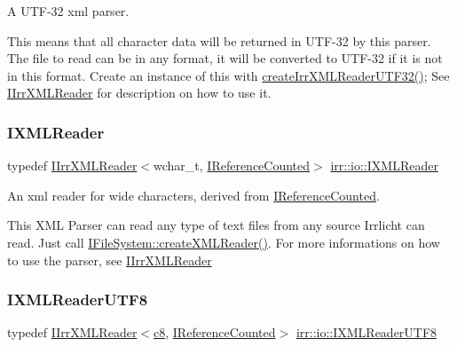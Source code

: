 A U\+T\+F-\/32 xml parser. 

This means that all character data will be returned in U\+T\+F-\/32 by this parser. The file to read can be in any format, it will be converted to U\+T\+F-\/32 if it is not in this format. Create an instance of this with \hyperlink{namespaceirr_1_1io_ae05bf7ee342431ea8c98fb98e75b974a}{create\+Irr\+X\+M\+L\+Reader\+U\+T\+F32()}; See \hyperlink{classirr_1_1io_1_1IIrrXMLReader}{I\+Irr\+X\+M\+L\+Reader} for description on how to use it. \mbox{\label{namespaceirr_1_1io_a9dc6291fb7e4c73155a3e3c8339f9bff}} 
\subsubsection{\texorpdfstring{I\+X\+M\+L\+Reader}{IXMLReader}}
{\footnotesize\ttfamily typedef \hyperlink{classirr_1_1io_1_1IIrrXMLReader}{I\+Irr\+X\+M\+L\+Reader}$<$wchar\+\_\+t, \hyperlink{classirr_1_1IReferenceCounted}{I\+Reference\+Counted}$>$ \hyperlink{namespaceirr_1_1io_a9dc6291fb7e4c73155a3e3c8339f9bff}{irr\+::io\+::\+I\+X\+M\+L\+Reader}}



An xml reader for wide characters, derived from \hyperlink{classirr_1_1IReferenceCounted}{I\+Reference\+Counted}. 

This X\+ML Parser can read any type of text files from any source Irrlicht can read. Just call \hyperlink{classirr_1_1io_1_1IFileSystem_a167c9fa159d16ee5c56c074636b0865e}{I\+File\+System\+::create\+X\+M\+L\+Reader()}. For more informations on how to use the parser, see \hyperlink{classirr_1_1io_1_1IIrrXMLReader}{I\+Irr\+X\+M\+L\+Reader} \mbox{\label{namespaceirr_1_1io_a2dedc8156931082e6b147b562195e310}} 
\subsubsection{\texorpdfstring{I\+X\+M\+L\+Reader\+U\+T\+F8}{IXMLReaderUTF8}}
{\footnotesize\ttfamily typedef \hyperlink{classirr_1_1io_1_1IIrrXMLReader}{I\+Irr\+X\+M\+L\+Reader}$<$\hyperlink{namespaceirr_a9395eaea339bcb546b319e9c96bf7410}{c8}, \hyperlink{classirr_1_1IReferenceCounted}{I\+Reference\+Counted}$>$ \hyperlink{namespaceirr_1_1io_a2dedc8156931082e6b147b562195e310}{irr\+::io\+::\+I\+X\+M\+L\+Reader\+U\+T\+F8}}



